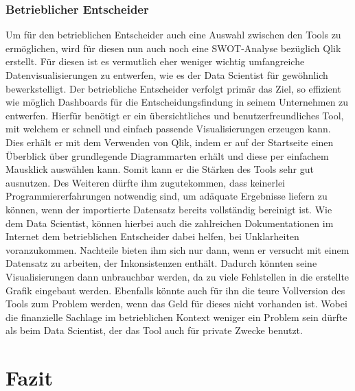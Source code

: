 \documentclass[12pt]{article}
\begin{document}
	\subsubsection{Betrieblicher Entscheider}
	
	Um für den betrieblichen Entscheider auch eine Auswahl zwischen den Tools zu
	ermöglichen, wird für diesen nun auch noch eine SWOT-Analyse bezüglich Qlik erstellt.
	Für diesen ist es vermutlich eher weniger wichtig umfangreiche Datenvisualisierungen
	zu entwerfen, wie es der Data Scientist für gewöhnlich bewerkstelligt. Der betriebliche
	Entscheider verfolgt primär das Ziel, so effizient wie möglich Dashboards für die
	Entscheidungsfindung in seinem Unternehmen zu entwerfen.
	Hierfür benötigt er ein übersichtliches und benutzerfreundliches Tool, mit welchem er
	schnell und einfach passende Visualisierungen erzeugen kann. Dies erhält er mit dem
	Verwenden von Qlik, indem er auf der Startseite einen Überblick über grundlegende
	Diagrammarten erhält und diese per einfachem Mausklick auswählen kann.
	Somit kann er die Stärken des Tools sehr gut ausnutzen.
	Des Weiteren dürfte ihm zugutekommen, dass keinerlei Programmiererfahrungen
	notwendig sind, um adäquate Ergebnisse liefern zu können, wenn der importierte
	Datensatz bereits vollständig bereinigt ist. Wie dem Data Scientist, können hierbei auch
	die zahlreichen Dokumentationen im Internet dem betrieblichen Entscheider dabei
	helfen, bei Unklarheiten voranzukommen.
	Nachteile bieten ihm sich nur dann, wenn er versucht mit einem Datensatz zu arbeiten,
	der Inkonsistenzen enthält. Dadurch könnten seine Visualisierungen dann unbrauchbar
	werden, da zu viele Fehlstellen in die erstellte Grafik eingebaut werden.
	Ebenfalls könnte auch für ihn die teure Vollversion des Tools zum Problem werden, wenn
	das Geld für dieses nicht vorhanden ist. Wobei die finanzielle Sachlage im betrieblichen
	Kontext weniger ein Problem sein dürfte als beim Data Scientist, der das Tool auch für
	private Zwecke benutzt.
	
	\section{Fazit} %
	
\end{document}
